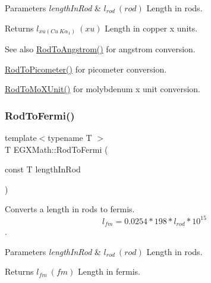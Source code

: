 \begin{DoxyParams}{Parameters}
{\em length\+In\+Rod} & $ l_{rod}\ (rod)$ Length in rods. \\
\hline
\end{DoxyParams}
\begin{DoxyReturn}{Returns}
$ l_{xu(Cu\ K\alpha_1)}\ (xu)$ Length in copper x units. 
\end{DoxyReturn}
\begin{DoxySeeAlso}{See also}
\mbox{\hyperlink{group___e_g_x_math-_conversions-_length_conversions-_surveyors-_rod-_non-_s_i_ga079b9122c8747685d7057ec05fefdb7f}{Rod\+To\+Angstrom()}} for angstrom conversion. 

\mbox{\hyperlink{group___e_g_x_math-_conversions-_length_conversions-_surveyors-_rod-_s_i_ga212e66c6922a0df85714ec8559af8790}{Rod\+To\+Picometer()}} for picometer conversion. 

\mbox{\hyperlink{group___e_g_x_math-_conversions-_length_conversions-_surveyors-_rod-_non-_s_i_gac5c3c27eea891ef32353d16c6b8c57ab}{Rod\+To\+Mo\+X\+Unit()}} for molybdenum x unit conversion. 
\end{DoxySeeAlso}
\mbox{\label{group___e_g_x_math-_conversions-_length_conversions-_surveyors-_rod-_non-_s_i_ga8397c0761e32cb6cfa632854d26023a5}} 
\subsubsection{\texorpdfstring{Rod\+To\+Fermi()}{RodToFermi()}}
{\footnotesize\ttfamily template$<$typename T $>$ \\
T E\+G\+X\+Math\+::\+Rod\+To\+Fermi (\begin{DoxyParamCaption}\item[{const T}]{length\+In\+Rod }\end{DoxyParamCaption})}



Converts a length in rods to fermis. \[ l_{fm}=0.0254 * 198 * l_{rod} * 10^{15} \]. 


\begin{DoxyParams}{Parameters}
{\em length\+In\+Rod} & $ l_{rod}\ (rod)$ Length in rods. \\
\hline
\end{DoxyParams}
\begin{DoxyReturn}{Returns}
$ l_{fm}\ (fm)$ Length in fermis. 
\end{DoxyReturn}
\mbox{\label{group___e_g_x_math-_conversions-_length_conversions-_surveyors-_rod-_non-_s_i_ga91daf7bb89d486f6c8523a5436e5599d}} 
